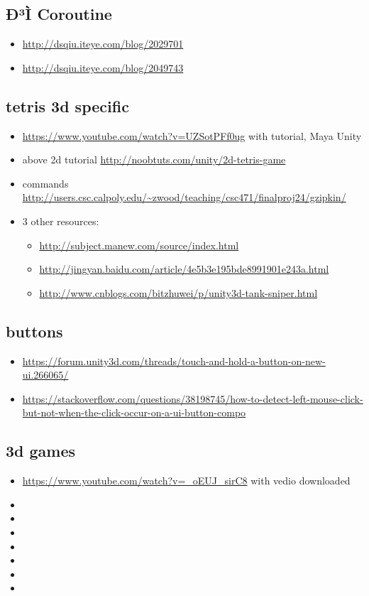\documentclass[9pt, b5paper]{article}
\begin{document}
\subsection{Ð­³Ì Coroutine}
\label{sec-1-2}
\begin{itemize}
\item \url{http://dsqiu.iteye.com/blog/2029701}
\item \url{http://dsqiu.iteye.com/blog/2049743}
\end{itemize}

\subsection{tetris 3d specific}
\label{sec-1-3}
\begin{itemize}
\item \url{https://www.youtube.com/watch?v=UZSotPFf0ug} with tutorial, Maya Unity
\item above 2d tutorial \url{http://noobtuts.com/unity/2d-tetris-game}
\item commands \url{http://users.csc.calpoly.edu/~zwood/teaching/csc471/finalproj24/gzipkin/}
\item 3 other resources: 
\begin{itemize}
\item \url{http://subject.manew.com/source/index.html}
\item \url{http://jingyan.baidu.com/article/4e5b3e195bde8991901e243a.html}
\item \url{http://www.cnblogs.com/bitzhuwei/p/unity3d-tank-sniper.html}
\end{itemize}
\end{itemize}
\subsection{buttons}
\label{sec-1-4}
\begin{itemize}
\item \url{https://forum.unity3d.com/threads/touch-and-hold-a-button-on-new-ui.266065/}
\item \url{https://stackoverflow.com/questions/38198745/how-to-detect-left-mouse-click-but-not-when-the-click-occur-on-a-ui-button-compo}
\end{itemize}
\subsection{3d games}
\label{sec-1-5}
\begin{itemize}
\item \url{https://www.youtube.com/watch?v=_oEUJ_sirC8} with vedio downloaded
\item 
\item 
\item 
\item 
\item 
\item 
\item 
\end{itemize}
\end{document}
